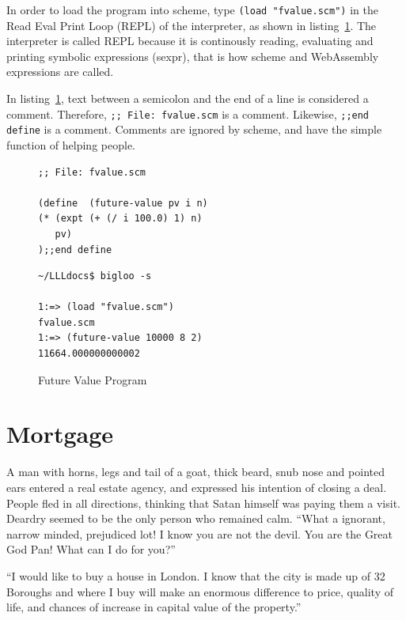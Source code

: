 \documentclass[a4paper,12pt]{book}
\newenvironment{fmpage}[1]
           {\begin{lrbox}{\fmbox}\begin{minipage}{#1}}
           {\end{minipage}\end{lrbox}\fbox{\usebox{\fmbox}}}
\begin{document}
In order to load the program into
scheme, type \verb|(load "fvalue.scm")|
in the Read Eval Print Loop (REPL) of the interpreter,
as shown in listing~\ref{Texan:parking}. The
interpreter is called REPL because it is
continously reading, evaluating and printing
symbolic expressions (sexpr), that is how
scheme and WebAssembly expressions are called.

In listing~\ref{Texan:parking}, text
between a semicolon and the end of
a line is considered a comment.
Therefore, \verb|;; File: fvalue.scm|
is a comment. Likewise, \verb|;;end define|
is a comment. Comments are ignored by
scheme, and have the simple function of
helping people.

\begin{figure}[!h]
\begin{fmpage}{0.8\textwidth}
\begin{verbatim}
;; File: fvalue.scm

(define  (future-value pv i n)
(* (expt (+ (/ i 100.0) 1) n) 
   pv)
);;end define
\end{verbatim}
\end{fmpage}

\begin{fmpage}{0.8\textwidth}
\begin{verbatim}
~/LLLdocs$ bigloo -s

1:=> (load "fvalue.scm")
fvalue.scm
1:=> (future-value 10000 8 2)
11664.000000000002
\end{verbatim}
\end{fmpage}
\caption{Future Value Program}
\label{Texan:parking}
\end{figure}


\section{Mortgage}
A man with horns, legs and tail of a goat,
thick beard, snub nose and pointed ears entered
a real estate agency, and expressed his intention
of closing a deal. People fled in all directions,
thinking that Satan himself was paying them a visit.
Deardry seemed to be the only person who remained
calm. “What a ignorant, narrow minded, prejudiced
lot! I know you are not the devil. You are the
Great God Pan! What can I do for you?”


“I would like to buy a house in London.
I know that the city is made up of 32 Boroughs
and where I buy will make an enormous difference
to price, quality of life, and chances of increase
in capital value of the property.”
\end{document}
